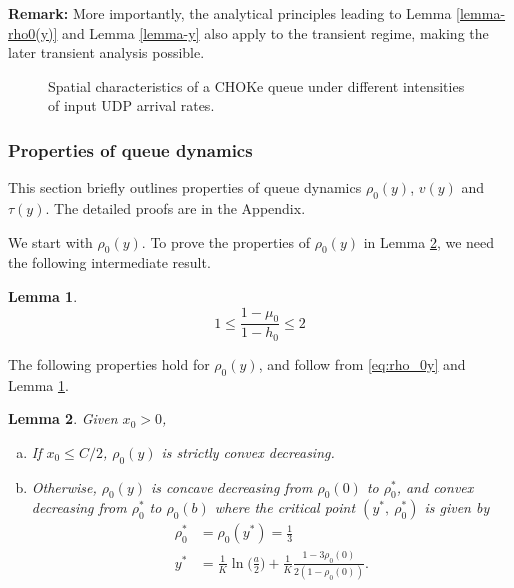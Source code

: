 \documentclass{IEEEtran}
\newtheorem{lemma}{Lemma}
\begin{document}
{\bf Remark:} More importantly, the analytical principles leading to Lemma \ref{lemma-rho0(y)} and Lemma \ref{lemma-y} also apply to the transient regime, making the later transient analysis possible.




    \begin{figure*}
        \begin{minipage}[htb!]{0.98\linewidth}\centering
            \caption{Spatial characteristics of a CHOKe queue under different intensities of input UDP arrival rates.}
\label{fig:ss_CHOKEproperties}
        \end{minipage}
    \end{figure*}

    \subsubsection{Properties of queue dynamics}\label{subsub:sdmProperties}
This section briefly outlines properties of queue dynamics $\rho_0(y)$, $v(y)$ and $\tau(y)$. The detailed proofs are in the Appendix.


We start with $\rho_0(y)$. To prove the properties of $\rho_0(y)$ in Lemma \ref{eq:lemmaRho_0Y}, we need the following intermediate result.
\begin{lemma}\label{lemma:intermediateR}
    \begin{equation}\nonumber
        1 \leq \frac{1-\mu_0}{1-h_0} \leq 2
    \end{equation}
\end{lemma}

The following properties hold for $\rho_0(y)$, and follow from \eqref{eq:rho_0y} and Lemma \ref{lemma:intermediateR}.
    \begin{lemma}\label{eq:lemmaRho_0Y}
       Given $x_0>0$, \begin{enumerate}[(a)]
             \item If $x_0 \leqslant C/2$, $\rho_0(y)$ is strictly convex decreasing.
             \item Otherwise, $\rho_0(y)$ is concave decreasing from $\rho_0(0)$ to $\rho_0^*$, and  convex decreasing from $\rho_0^*$ to $\rho_0(b)$ where the critical point $(y^*,~\rho_0^*)$ is given by
                    \begin{align}
                        \rho_0^*    &=\rho_0(y^*)= \frac{1}{3} \nonumber \\
                        y^*         &= \frac{1}{K} \ln\bigg(\frac{a}{2}\bigg)+\frac{1}{K} \frac{1-3\rho_0(0)}{2(1-\rho_0(0))}. \nonumber
                \end{align}
        \end{enumerate}
    \end{lemma}
\end{document}
